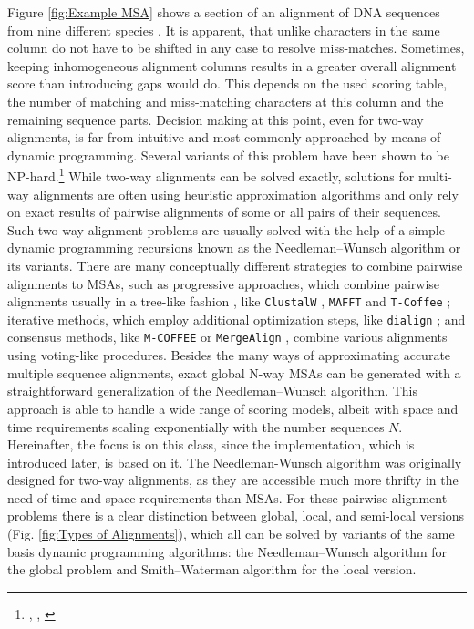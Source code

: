 \documentclass[a4paper,10pt]{thesis}
\begin{document}
{{{      Figure \ref{fig:Example MSA} shows a section of an alignment of DNA sequences from nine different species . It is apparent, that unlike characters in the same column do not have to be shifted in any case to resolve miss-matches. Sometimes, keeping inhomogeneous alignment columns results in a greater overall alignment score than introducing gaps would do. This depends on the used scoring table, the number of matching and miss-matching characters at this column and the remaining sequence parts. Decision making at this point, even for two-way alignments, is far from intuitive and most commonly approached by means of dynamic programming. Several variants of this problem have been shown to be NP-hard.\footnote{\cite{Bonizzoni:01}, \cite{Elias:06}, \cite{Just:01}} While two-way alignments can be solved exactly, solutions for multi-way alignments are often using heuristic approximation algorithms  and only rely on exact results of pairwise alignments of some or all pairs of their sequences. Such two-way alignment problems are usually solved with the help of a simple dynamic programming recursions known as the Needleman–Wunsch algorithm  or its variants. There are many conceptually different strategies to combine pairwise alignments to MSAs, such as progressive approaches, which combine pairwise alignments usually in a tree-like fashion , like \texttt{ClustalW} , \texttt{MAFFT}  and \texttt{T-Coffee} ; iterative methods, which employ additional optimization steps, like \texttt{dialign} ; and consensus methods, like \texttt{M-COFFEE}  or \texttt{MergeAlign} , combine various alignments using voting-like procedures.
      \gapBig
      Besides the many ways of approximating accurate multiple sequence alignments, exact global N-way MSAs can be generated with a straightforward generalization of the Needleman–Wunsch algorithm. This approach is able to handle a wide range of scoring models, albeit with space and time requirements scaling exponentially with the number sequences $N$.  
      Hereinafter, the focus is on this class, since the implementation, which is introduced later, is based on it. 
      \gapSmall
      The Needleman-Wunsch algorithm was originally designed for two-way alignments, as they are accessible much more thrifty in the need of time and space requirements than MSAs. For these pairwise alignment problems there is a clear distinction between global, local, and semi-local versions (Fig. \ref{fig:Types of Alignments}), which all can be solved by variants of the same basis dynamic programming algorithms: the Needleman–Wunsch algorithm  for the global problem and Smith–Waterman algorithm  for the local version.
}}}
\end{document}
